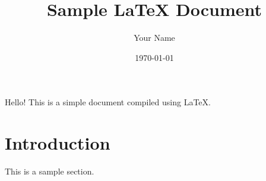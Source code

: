 \documentclass{article}
\begin{document}
\title{Sample LaTeX Document}
\author{Your Name}
\date{\today}

\maketitle

Hello! This is a simple document compiled using \LaTeX{}.

\section{Introduction}
This is a sample section.
\end{document}
